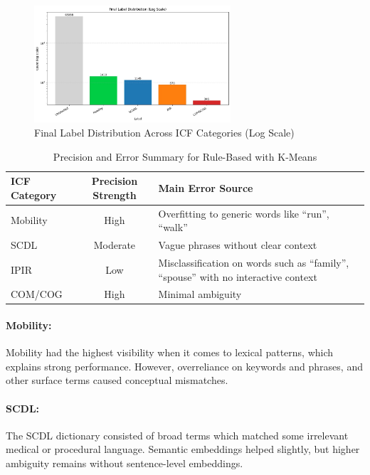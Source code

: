 \begin{figure}[H]
\centering
\includegraphics[width=0.65\textwidth]{images/Unsupervised_Results/rulebased_icf_distribution.jpg}
\caption{Final Label Distribution Across ICF Categories (Log Scale)}
\label{fig:rulebased-icf-distribution}
\end{figure}

\vspace{0.5cm}

\begin{table}[H]
\centering
\caption{Precision and Error Summary for Rule-Based with K-Means}
\label{tab:precision-summary}
\begin{tabular}{l c p{8cm}}  %
\toprule
\textbf{ICF Category} & \textbf{Precision Strength} & \textbf{Main Error Source} \\
\midrule
Mobility & High & Overfitting to generic words like ``run'', ``walk'' \\
SCDL & Moderate & Vague phrases without clear context \\
IPIR & Low & Misclassification on words such as ``family'', ``spouse'' with no interactive context \\
COM/COG & High & Minimal ambiguity \\
\bottomrule
\end{tabular}
\end{table}

\paragraph{Mobility:} Mobility had the highest visibility when it comes to lexical patterns, which explains strong performance. However, overreliance on keywords and phrases, and other surface terms caused conceptual mismatches.

\paragraph{SCDL:} The SCDL dictionary consisted of broad terms which matched some irrelevant medical or procedural language. Semantic embeddings helped slightly, but higher ambiguity remains without sentence-level embeddings.

